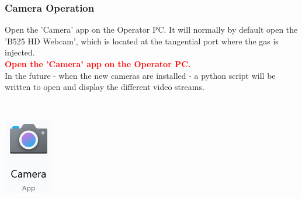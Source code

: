 \documentclass[fleqn,a4paper,20pt]{article}
\begin{document}
\subsubsection{Camera Operation}

\begin{minipage}{.78\textwidth}
	Open the 'Camera' app on the Operator PC. It will normally by default open the 'B525 HD Webcam', which is located at the tangential port where the gas is injected.\\
	
	\textcolor{red}{\textbf{Open the 'Camera' app on the Operator PC.}}\\
	
In the future - when the new cameras are installed - a python script will be written to open and display the different video streams.
	
\end{minipage}
\begin{minipage}{.02\textwidth}
	$\ $\\
\end{minipage}
\begin{minipage}{.15\textwidth}
	\centering
	\includegraphics[width=0.85\linewidth]{Cam1}
\end{minipage}
\end{document}
